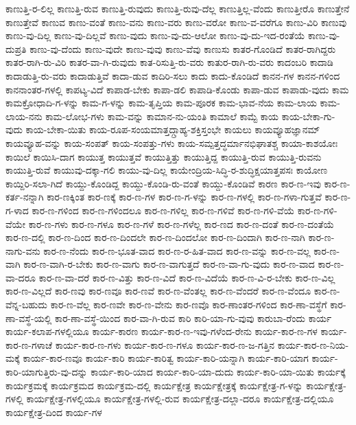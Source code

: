 {ಕಾಣುತ್ತಿ-ರ-ಲಿಲ್ಲ
ಕಾಣುತ್ತಿ-ರುವ
ಕಾಣುತ್ತಿ-ರುವುದು
ಕಾಣುತ್ತಿ-ರುವು-ದೆಲ್ಲ
ಕಾಣುತ್ತಿಲ್ಲ-ವೆಂದು
ಕಾಣುತ್ತೀರೊ
ಕಾಣುತ್ತೇನೆ
ಕಾಣುತ್ತೇವೆ
ಕಾಣುವ
ಕಾಣು-ವಂತೆ
ಕಾಣು-ವನು
ಕಾಣು-ವರು
ಕಾಣು-ವರೋ
ಕಾಣು-ವ-ವರೆಗೂ
ಕಾಣು-ವಿರಿ
ಕಾಣುವು
ಕಾಣು-ವು-ದಿಲ್ಲ
ಕಾಣು-ವು-ದಿಲ್ಲವೆ
ಕಾಣು-ವುದು
ಕಾಣು-ವು-ದು-ಆಲೋ
ಕಾಣು-ವು-ದು-ಇದ-ರಂತೆಯೆ
ಕಾಣು-ವು-ದುಪ್ರತಿ
ಕಾಣು-ವು-ದೆಂದು
ಕಾಣು-ವುದೇ
ಕಾಣು-ವುವು
ಕಾಣು-ವೆವು
ಕಾಣುಸು
ಕಾತರ-ಗೊಂಡಿದೆ
ಕಾತರ-ರಾಗಿದ್ದರು
ಕಾತರ-ರಾಗಿ-ರು-ವಿರಿ
ಕಾತರ-ವಾ-ಗಿ-ರುವುದು
ಕಾತ-ರಿಸುತ್ತಿ-ರು-ವರು
ಕಾತುರ-ರಾಗಿ-ರು-ವರು
ಕಾದಂಬರಿ
ಕಾದಾಡಿ
ಕಾದಾಡುತ್ತಿ-ರು-ವರು
ಕಾದಾಡುತ್ತಿವೆ
ಕಾದಾ-ಡುವ
ಕಾದಿರಿ-ಸಲು
ಕಾದು
ಕಾದು-ಕೊಂಡಿದೆ
ಕಾನನ-ಗಳ
ಕಾನನ-ಗಳಿಂದ
ಕಾನನಾಂತರ-ಗಳಲ್ಲಿ
ಕಾಪಟ್ಯ-ವಿದೆ
ಕಾಪಾಡ-ಬೇಕು
ಕಾಪಾ-ಡಲಿ
ಕಾಪಾಡಿ-ಕೊಂಡು
ಕಾಪಾ-ಡುವ
ಕಾಪಾಡು-ವುದು
ಕಾಮ
ಕಾಮಕ್ರೋಧಾದಿ-ಗ-ಳನ್ನು
ಕಾಮ-ಗ-ಳನ್ನು
ಕಾಮ-ತೃಪ್ತಿಯ
ಕಾಮ-ಪೂರಕ
ಕಾಮ-ಭಾವ-ನೆಯ
ಕಾಮ-ಲಾಯ
ಕಾಮ-ಲಾಯ-ನನು
ಕಾಮ-ಲೋಭ-ಗಳು
ಕಾಮ-ವನ್ನು
ಕಾಮಾನ-ನು-ಯಂತಿ
ಕಾಮಾಲೆ
ಕಾಮ್ಟೆ
ಕಾಯ
ಕಾಯ-ಬೇಕಾ-ಗು-ವುದು
ಕಾಯ-ಬೇಕಾ-ಯಿತು
ಕಾಯ-ರೂಪ-ಸಂಯಮಾತ್ತದ್ಗ್ರಾಹ್ಯ-ಶಕ್ತಿಸ್ತಂಭೇ
ಕಾಯಲು
ಕಾಯವ್ಯೂಹಜ್ಞಾನಮ್
ಕಾಯವ್ಯೂಹ-ವನ್ನು
ಕಾಯ-ಸಂಪತ್
ಕಾಯ-ಸಂಪತ್ತು-ಗಳು
ಕಾಯ-ಸಮ್ಪತ್ತದ್ಧರ್ಮಾನಭಿಘಾತಶ್ಚ
ಕಾಯಾ-ಕಾಶಯೋಃ
ಕಾಯಿಲೆ
ಕಾಯಿಸಿ-ದಾಗ
ಕಾಯುತ್ತ
ಕಾಯುತ್ತವೆ
ಕಾಯುತ್ತಿತ್ತು
ಕಾಯುತ್ತಿದ್ದ
ಕಾಯುತ್ತಿ-ರುವ
ಕಾಯುತ್ತಿ-ರುವನು
ಕಾಯುತ್ತಿ-ರುವೆ
ಕಾಯುವು-ದಕ್ಕಾ-ಗಲಿ
ಕಾಯು-ವು-ದಿಲ್ಲ
ಕಾಯೇಂದ್ರಿಯ-ಸಿದ್ಧಿ-ರ-ಶುದ್ಧಿಕ್ಷಯಾತ್ತಪಸಃ
ಕಾಯೋಣ
ಕಾಯ್ದಿರಿ-ಸಲಾ-ಗಿದೆ
ಕಾಯ್ದು-ಕೊಂಡಿದ್ದ
ಕಾಯ್ದು-ಕೊಂಡಿ-ರು-ವಂತೆ
ಕಾಯ್ದು-ಕೊಂಡಿವೆ
ಕಾರಣ
ಕಾರ-ಣ-ಇವು
ಕಾರ-ಣ-ಕರ್ತ-ನನ್ನಾಗಿ
ಕಾರ-ಣಕ್ಕಿಂತ
ಕಾರ-ಣಕ್ಕೆ
ಕಾರ-ಣ-ಗಳ
ಕಾರ-ಣ-ಗ-ಳನ್ನು
ಕಾರ-ಣ-ಗಳಲ್ಲಿ
ಕಾರ-ಣ-ಗಳಾ-ಗುತ್ತವೆ
ಕಾರ-ಣ-ಗ-ಳಾದ
ಕಾರ-ಣ-ಗಳಿಂದ
ಕಾರ-ಣ-ಗಳಿಂದಲೂ
ಕಾರ-ಣ-ಗಳಿಲ್ಲ
ಕಾರ-ಣ-ಗಳಿವೆ
ಕಾರ-ಣ-ಗಳಿ-ವೆಯೆ
ಕಾರ-ಣ-ಗಳಿ-ವೆಯೇ
ಕಾರ-ಣ-ಗಳು
ಕಾರ-ಣ-ಗಳೂ
ಕಾರ-ಣ-ಗಳೆ
ಕಾರ-ಣ-ಗಳೆಲ್ಲ
ಕಾರ-ಣದ
ಕಾರ-ಣ-ದಂತೆ
ಕಾರ-ಣ-ದಂತೆಯೆ
ಕಾರ-ಣ-ದಲ್ಲಿ
ಕಾರ-ಣ-ದಿಂದ
ಕಾರ-ಣ-ದಿಂದಲೇ
ಕಾರ-ಣ-ದಿಂದಲೋ
ಕಾರ-ಣ-ದಿಂದಾಗಿ
ಕಾರ-ಣ-ನಾಗಿ
ಕಾರ-ಣ-ನಾಗು-ವನು
ಕಾರ-ಣ-ನೆಂದು
ಕಾರ-ಣ-ಭೂತ-ವಾದ
ಕಾರ-ಣ-ರ-ಹಿತ-ವಾದ
ಕಾರ-ಣ-ವನ್ನು
ಕಾರ-ಣ-ವಲ್ಲ
ಕಾರ-ಣ-ವಾಗಿ
ಕಾರ-ಣ-ವಾಗಿ-ರ-ಬೇಕು
ಕಾರ-ಣ-ವಾಗು
ಕಾರ-ಣ-ವಾಗುತ್ತದೆ
ಕಾರ-ಣ-ವಾ-ಗು-ವುದು
ಕಾರ-ಣ-ವಾದ
ಕಾರ-ಣ-ವಾ-ದರೂ
ಕಾರ-ಣ-ವಾ-ದರೆ
ಕಾರ-ಣ-ವಿತ್ತು
ಕಾರ-ಣ-ವಿದೆ
ಕಾರ-ಣ-ವಿದೆಯೆ
ಕಾರ-ಣ-ವಿ-ರ-ಬೇಕು
ಕಾರ-ಣ-ವಿಲ್ಲ
ಕಾರ-ಣ-ವಿಲ್ಲದೆ
ಕಾರ-ಣವು
ಕಾರ-ಣವೂ
ಕಾರ-ಣವೆ
ಕಾರ-ಣ-ವೆಂತಲ್ಲ
ಕಾರ-ಣ-ವೆಂದರೆ
ಕಾರ-ಣ-ವೆಂದೂ
ಕಾರ-ಣ-ವೆನ್ನ-ಬಹುದು
ಕಾರ-ಣ-ವೆಲ್ಲ
ಕಾರ-ಣವೇ
ಕಾರ-ಣ-ವೇನು
ಕಾರ-ಣವೊ
ಕಾರ-ಣಾಂತರ-ಗಳಿಂದ
ಕಾರ-ಣಾ-ವಸ್ಥೆಗೆ
ಕಾರ-ಣಾ-ವಸ್ಥೆ-ಯಲ್ಲಿ
ಕಾರ-ಣಾ-ವಸ್ಥೆ-ಯಿಂದ
ಕಾರ-ವಾ-ಗಿ-ರುವ
ಕಾರಿ
ಕಾರಿ-ಯಾ-ಗು-ವುವು
ಕಾರುಬಾ-ರೆಂದು
ಕಾರ್ಯ
ಕಾರ್ಯ-ಕಲಾಪ-ಗಳಲ್ಲಿಯೂ
ಕಾರ್ಯ-ಕಾರಣ
ಕಾರ್ಯ-ಕಾರ-ಣ-ಇವು-ಗಳೆಂದ-ರೇನು
ಕಾರ್ಯ-ಕಾರ-ಣ-ಗಳ
ಕಾರ್ಯ-ಕಾರ-ಣ-ಗಳಾಚೆ
ಕಾರ್ಯ-ಕಾರ-ಣ-ಗಳು
ಕಾರ್ಯ-ಕಾರ-ಣ-ಗಳೂ
ಕಾರ್ಯ-ಕಾರ-ಣ-ಜ-ಗತ್ತಿನ
ಕಾರ್ಯ-ಕಾರ-ಣ-ನಿಯ-ಮಕ್ಕೆ
ಕಾರ್ಯ-ಕಾರ-ಣವೂ
ಕಾರ್ಯ-ಕಾರಿ
ಕಾರ್ಯ-ಕಾರಿತ್ವ
ಕಾರ್ಯ-ಕಾರಿ-ಯನ್ನಾಗಿ
ಕಾರ್ಯ-ಕಾರಿ-ಯಾಗ
ಕಾರ್ಯ-ಕಾರಿ-ಯಾಗುತ್ತಿರು-ವು-ದನ್ನು
ಕಾರ್ಯ-ಕಾರಿ-ಯಾದ
ಕಾರ್ಯ-ಕಾರಿ-ಯಾ-ದುದು
ಕಾರ್ಯ-ಕಾರಿ-ಯಾ-ಯಿತು
ಕಾರ್ಯಕ್ಕೆ
ಕಾರ್ಯಕ್ರಮಕ್ಕೆ
ಕಾರ್ಯಕ್ರಮದ
ಕಾರ್ಯಕ್ರಮ-ದಲ್ಲಿ
ಕಾರ್ಯಕ್ಷೇತ್ರ
ಕಾರ್ಯಕ್ಷೇತ್ರಕ್ಕೆ
ಕಾರ್ಯಕ್ಷೇತ್ರ-ಗ-ಳನ್ನು
ಕಾರ್ಯಕ್ಷೇತ್ರ-ಗಳಲ್ಲಿ
ಕಾರ್ಯಕ್ಷೇತ್ರ-ಗಳಲ್ಲಿಯೂ
ಕಾರ್ಯಕ್ಷೇತ್ರ-ಗಳಲ್ಲಿ-ರುವ
ಕಾರ್ಯಕ್ಷೇತ್ರ-ದಲ್ಲಾ-ದರೂ
ಕಾರ್ಯಕ್ಷೇತ್ರ-ದಲ್ಲಿಯೂ
ಕಾರ್ಯಕ್ಷೇತ್ರ-ದಿಂದ
ಕಾರ್ಯ-ಗಳ
}
